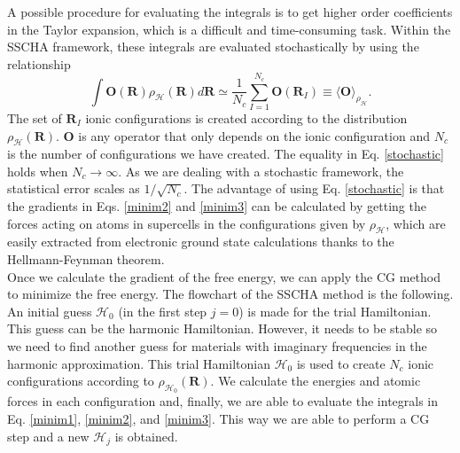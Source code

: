 A possible procedure for evaluating the integrals is to get higher order coefficients in the Taylor expansion, which is a difficult and time-consuming task. Within the SSCHA framework, these integrals are evaluated 
stochastically by using the relationship
\begin{equation}
 \label{stochastic}
\int{\mathbf{O}(\mathbf{R})\rho_{\mathcal{H}}(\mathbf{R})d\mathbf{R}}\simeq\frac{1}{N_{c}}\sum_{I=1}^{N_{c}}\mathbf{O}(\mathbf{R}_{I})\equiv\langle\mathbf{O}\rangle_{\rho_{\mathcal{H}}}.
\end{equation}
The set of $\mathbf{R}_{I}$ ionic configurations is created according to the distribution $\rho_{\mathcal{H}}(\mathbf{R})$. $\mathbf{O}$ is any operator that only depends on the ionic configuration and $N_{c}$ is the number of 
configurations we have created. The equality in Eq. \ref{stochastic} holds when $N_{c}\rightarrow\infty$. As we are dealing with a stochastic framework, the statistical error scales as $1/\sqrt{N_{c}}$. The advantage 
of using Eq. \ref{stochastic} is that the gradients in Eqs. \ref{minim2} and \ref{minim3} can be calculated by getting the forces acting on atoms in supercells in the configurations given by $\rho_{\mathcal{H}}$, which are easily 
extracted from electronic ground state calculations thanks to the Hellmann-Feynman 
theorem\cite{feynman1939forces}. \\

Once we calculate the gradient of the free energy, we can apply the CG method to minimize the free energy. The flowchart of the SSCHA method is the following. An initial guess $\mathcal{H}_{0}$ (in the first 
step $j=0$) is made for the trial Hamiltonian. This guess can be the harmonic Hamiltonian. However, it needs to be stable so we need to find another guess for materials with imaginary frequencies in the harmonic approximation. This 
trial Hamiltonian $\mathcal{H}_{0}$ is used to create $N_{c}$ ionic configurations according to $\rho_{\mathcal{H}_{0}}(\mathbf{R})$. We calculate the energies and atomic forces in each configuration and, finally, we are able to 
evaluate the integrals in Eq. \ref{minim1}, \ref{minim2}, and \ref{minim3}. This way we are able to perform a CG step and a new $\mathcal{H}_{j}$ is obtained. \\

